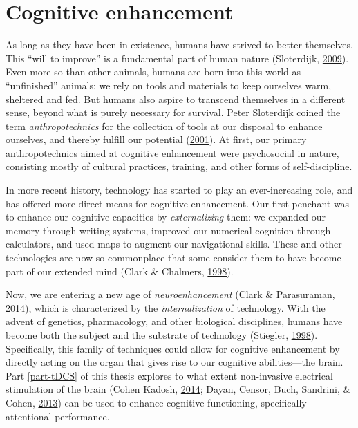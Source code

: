 \documentclass[12pt,a4paper,oldfontcommands]{memoir}
\begin{document}
\hypertarget{cognitive-enhancement}{%
\section{Cognitive enhancement}\label{cognitive-enhancement}}

As long as they have been in existence, humans have strived to better themselves. This ``will to improve'' is a fundamental part of human nature (Sloterdijk, \protect\hyperlink{ref-Sloterdijk2009}{2009}). Even more so than other animals, humans are born into this world as ``unfinished'' animals: we rely on tools and materials to keep ourselves warm, sheltered and fed. But humans also aspire to transcend themselves in a different sense, beyond what is purely necessary for survival. Peter Sloterdijk coined the term \emph{anthropotechnics} for the collection of tools at our disposal to enhance ourselves, and thereby fulfill our potential (\protect\hyperlink{ref-Sloterdijk2001}{2001}). At first, our primary anthropotechnics aimed at cognitive enhancement were psychosocial in nature, consisting mostly of cultural practices, training, and other forms of self-discipline.

In more recent history, technology has started to play an ever-increasing role, and has offered more direct means for cognitive enhancement. Our first penchant was to enhance our cognitive capacities by \emph{externalizing} them: we expanded our memory through writing systems, improved our numerical cognition through calculators, and used maps to augment our navigational skills. These and other technologies are now so commonplace that some consider them to have become part of our extended mind (Clark \& Chalmers, \protect\hyperlink{ref-Clark1998}{1998}).

Now, we are entering a new age of \emph{neuroenhancement} (Clark \& Parasuraman, \protect\hyperlink{ref-Clark2014}{2014}), which is characterized by the \emph{internalization} of technology. With the advent of genetics, pharmacology, and other biological disciplines, humans have become both the subject and the substrate of technology (Stiegler, \protect\hyperlink{ref-Stiegler1998}{1998}). Specifically, this family of techniques could allow for cognitive enhancement by directly acting on the organ that gives rise to our cognitive abilities---the brain. Part \ref{part-tDCS} of this thesis explores to what extent non-invasive electrical stimulation of the brain (Cohen Kadosh, \protect\hyperlink{ref-CohenKadosh2014}{2014}; Dayan, Censor, Buch, Sandrini, \& Cohen, \protect\hyperlink{ref-Dayan2013}{2013}) can be used to enhance cognitive functioning, specifically attentional performance.
\end{document}
